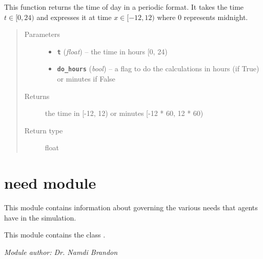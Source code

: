 \documentclass[letterpaper,10pt,english]{sphinxmanual}
\begin{document}
\begin{fulllineitems}
\label{my_globals:my_globals.to_periodic}
This function returns the time of day in a periodic format. It takes the time \(t \in [0, 24)\) and     expresses it at time \(x \in [-12, 12)\) where 0 represents midnight.
\begin{quote}\begin{description}
\item[{Parameters}] \leavevmode\begin{itemize}
\item {} 
\textbf{\texttt{t}} (\emph{float}) -- the time in hours {[}0, 24)

\item {} 
\textbf{\texttt{do\_hours}} (\emph{bool}) -- a flag to do the calculations in hours (if True) or minutes if False

\end{itemize}

\item[{Returns}] \leavevmode
the time in {[}-12, 12) or minutes {[}-12 * 60, 12 * 60)

\item[{Return type}] \leavevmode
float

\end{description}\end{quote}

\end{fulllineitems}



\section{need module}
\label{need::doc}\label{need:module-need}\label{need:need-module}
This module contains information about governing the various needs that agents have in the simulation.

This module contains the class {\hyperref[need:need.Need]{\emph{}}}.

\emph{Module author: Dr. Namdi Brandon}
\end{document}
